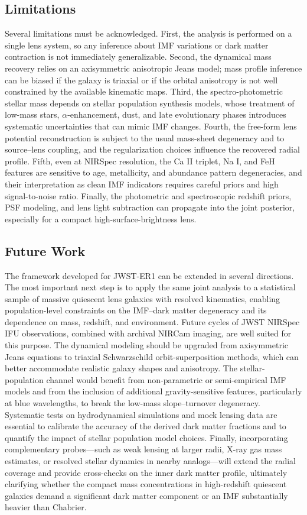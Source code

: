 \documentclass{article}
\begin{document}
\subsection*{Limitations}
Several limitations must be acknowledged. First, the analysis is performed on a single lens system, so any inference about IMF variations or dark matter contraction is not immediately generalizable. Second, the dynamical mass recovery relies on an axisymmetric anisotropic Jeans model; mass profile inference can be biased if the galaxy is triaxial or if the orbital anisotropy is not well constrained by the available kinematic maps. Third, the spectro-photometric stellar mass depends on stellar population synthesis models, whose treatment of low-mass stars, $\alpha$-enhancement, dust, and late evolutionary phases introduces systematic uncertainties that can mimic IMF changes. Fourth, the free-form lens potential reconstruction is subject to the usual mass-sheet degeneracy and to source--lens coupling, and the regularization choices influence the recovered radial profile. Fifth, even at NIRSpec resolution, the Ca II triplet, Na I, and FeH features are sensitive to age, metallicity, and abundance pattern degeneracies, and their interpretation as clean IMF indicators requires careful priors and high signal-to-noise ratio. Finally, the photometric and spectroscopic redshift priors, PSF modeling, and lens light subtraction can propagate into the joint posterior, especially for a compact high-surface-brightness lens.

\subsection*{Future Work}
The framework developed for JWST-ER1 can be extended in several directions. The most important next step is to apply the same joint analysis to a statistical sample of massive quiescent lens galaxies with resolved kinematics, enabling population-level constraints on the IMF--dark matter degeneracy and its dependence on mass, redshift, and environment. Future cycles of JWST NIRSpec IFU observations, combined with archival NIRCam imaging, are well suited for this purpose. The dynamical modeling should be upgraded from axisymmetric Jeans equations to triaxial Schwarzschild orbit-superposition methods, which can better accommodate realistic galaxy shapes and anisotropy. The stellar-population channel would benefit from non-parametric or semi-empirical IMF models and from the inclusion of additional gravity-sensitive features, particularly at blue wavelengths, to break the low-mass slope--turnover degeneracy. Systematic tests on hydrodynamical simulations and mock lensing data are essential to calibrate the accuracy of the derived dark matter fractions and to quantify the impact of stellar population model choices. Finally, incorporating complementary probes---such as weak lensing at larger radii, X-ray gas mass estimates, or resolved stellar dynamics in nearby analogs---will extend the radial coverage and provide cross-checks on the inner dark matter profile, ultimately clarifying whether the compact mass concentrations in high-redshift quiescent galaxies demand a significant dark matter component or an IMF substantially heavier than Chabrier.



\end{document}
